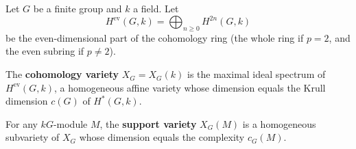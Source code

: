 \begin{definition}
\label{def:cohomology-variety}
Let $G$ be a finite group and $k$ a field. Let
$$
H^{\mathrm{ev}}(G, k) = \bigoplus_{n \geq 0} H^{2n}(G, k)
$$
be the even-dimensional part of the cohomology ring (the whole ring if $p = 2$, and the even subring if $p \neq 2$).

The \textbf{cohomology variety} $X_G = X_G(k)$ is the maximal ideal spectrum of $H^{\mathrm{ev}}(G, k)$, a homogeneous affine variety whose dimension equals the Krull dimension $c(G)$ of $H^*(G, k)$.

For any $kG$-module $M$, the \textbf{support variety} $X_G(M)$ is a homogeneous subvariety of $X_G$ whose dimension equals the complexity $c_G(M)$.
\end{definition}
